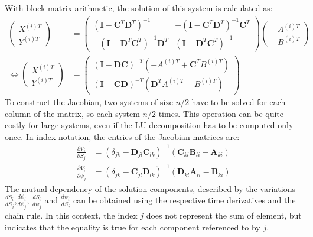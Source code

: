 \documentclass{report}
\begin{document}
With block matrix arithmetic, the solution of this system is calculated as: 
\begin{align}
	\begin{pmatrix}
		X^{(i)T} \\ Y^{(i)T}
	\end{pmatrix} &= \begin{pmatrix}
						 \left(\mathbf{I} - \mathbf{C}^T\mathbf{D}^T\right)^{-1} & 
						-\left(\mathbf{I} - \mathbf{C}^T\mathbf{D}^T\right)^{-1}\mathbf{C}^T \\
						-\left(\mathbf{I} - \mathbf{D}^T\mathbf{C}^T\right)^{-1}\mathbf{D}^T & 
						 \left(\mathbf{I} - \mathbf{D}^T\mathbf{C}^T\right)^{-1} 
					\end{pmatrix} \begin{pmatrix}
										-A^{(i)T} \\ -B^{(i)T}
									\end{pmatrix} \\ 
\Leftrightarrow
	\begin{pmatrix}
		X^{(i)T} \\ Y^{(i)T}
	\end{pmatrix} &= \begin{pmatrix}
		\left(\mathbf{I} - \mathbf{DC}\right)^{-T}\left(-A^{(i)T} + \mathbf{C}^TB^{(i)T}\right) \\
		\left(\mathbf{I} - \mathbf{CD}\right)^{-T}\left( \mathbf{D}^TA^{(i)T} - B^{(i)T}\right) 
					\end{pmatrix}
\end{align}
To construct the Jacobian, two systems of size $n/2$ have to be solved for each column of the matrix, so each system $n/2$ times. This operation can be quite costly for large systems, even if the LU-decomposition has to be computed only once. In index notation, the entries of the Jacobian matrices are:
\begin{align}
	 \frac{\partial V_i}{\partial S_j} &= \left(\delta_{jk} - \mathbf{D}_{jl}\mathbf{C}_{lk}\right)^{-1}\left(\mathbf{C}_{kl}\mathbf{B}_{li}-\mathbf{A}_{ki}\right) \\
	\frac{\partial V_i}{\partial \psi_j} &=\left(\delta_{jk} - \mathbf{C}_{jl}\mathbf{D}_{lk}\right)^{-1}\left(\mathbf{D}_{kl}\mathbf{A}_{li}-\mathbf{B}_{ki}\right) 
\end{align}
The mutual dependency of the solution components, described by the variations $\frac{d S_i}{d S_j}$,$\frac{d \psi_i}{d \psi_j}$, $\frac{d S_i}{d \psi_j}$ and $\frac{d \psi_i}{d S_j}$ can be obtained using the respective time derivatives and the chain rule. In this context, the index $j$ does not represent the sum of element, but indicates that the equality is true for each component referenced to by $j$.   
\end{document}
